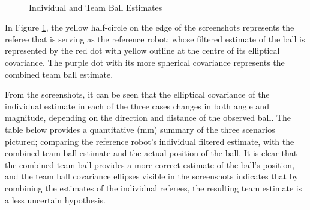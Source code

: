 \documentclass[runningheads,a4paper]{llncs}
\begin{document}
\begin{figure}[h!]
  \centering
  \\
  \caption{Individual and Team Ball Estimates\label{ellipse}}
\end{figure}

In Figure \ref{ellipse}, the yellow half-circle on the edge of the screenshots represents the referee that is serving as the reference robot; whose filtered estimate of the ball is represented by the red dot with yellow outline at the centre of its elliptical covariance. The purple dot with its more spherical covariance represents the combined team ball estimate.

From the screenshots, it can be seen that the elliptical covariance of the individual estimate in each of the three cases changes in both angle and magnitude, depending on the direction and distance of the observed ball. The table below provides a quantitative (mm) summary of the three scenarios pictured; comparing the reference robot's individual filtered estimate, with the combined team ball estimate and the actual position of the ball. It is clear that the combined team ball provides a more correct estimate of the ball's position, and the team ball covariance ellipses visible in the screenshots indicates that by combining the estimates of the individual referees, the resulting team estimate is a less uncertain hypothesis.
\end{document}
